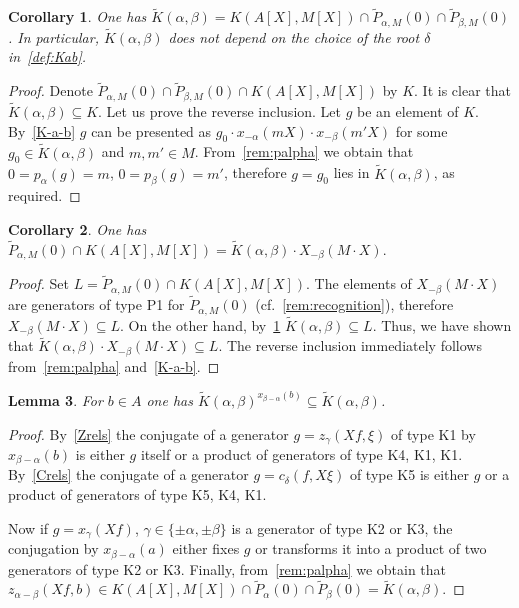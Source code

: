 \documentclass[oneside, 8pt]{amsart}
\newtheorem{lemma}{Lemma}
\newtheorem{corollary}[lemma]{Corollary}
\theoremstyle{remark}
\theoremstyle{definition}
\numberwithin{lemma}{section}
\numberwithin{prop}{section}
\numberwithin{corollary}{section}
\numberwithin{externaltheorem}{section}
\numberwithin{equation}{section}
\begin{document}
\begin{corollary} \label{K-a-b-cor}
One has $\widetilde{K}(\alpha, \beta) = K(A[X], M[X]) \cap \widetilde{P}_{\alpha, M}(0) \cap \widetilde{P}_{\beta, M}(0)$. In particular, $\widetilde{K}(\alpha, \beta)$ does not depend on the choice of the root $\delta$ in~\cref{def:Kab}.
\end{corollary}
\begin{proof} Denote $\widetilde{P}_{\alpha, M}(0) \cap \widetilde{P}_{\beta, M}(0) \cap K(A[X], M[X])$ by $K$. It is clear that $\widetilde{K}(\alpha, \beta) \subseteq K$. 
Let us prove the reverse inclusion. Let $g$ be an element of $K$.
By~\cref{K-a-b} $g$ can be presented as $g_0 \cdot x_{-\alpha}(mX) \cdot x_{-\beta}(m'X)$ for some $g_0 \in \widetilde{K}(\alpha, \beta)$ and $m, m' \in M$. From~\cref{rem:palpha} we obtain that $0 = p_\alpha(g) = m$, $0 = p_\beta(g) = m'$, therefore $g = g_0$ lies in $\widetilde{K}(\alpha, \beta)$, as required.\end{proof}

\begin{corollary} \label{K-a-b-cor2}
 One has $\widetilde{P}_{\alpha, M}(0) \cap K(A[X], M[X]) = \widetilde{K}(\alpha, \beta) \cdot X_{-\beta}(M \cdot X).$ 
\end{corollary}
\begin{proof} Set $L = \widetilde{P}_{\alpha, M}(0) \cap K(A[X], M[X])$.
The elements of $X_{-\beta}(M\cdot X)$ are generators of type P1 for $\widetilde{P}_{\alpha, M}(0)$ (cf.~\cref{rem:recognition}),
 therefore $X_{-\beta}(M \cdot X) \subseteq L$. On the other hand, by~\cref{K-a-b-cor} $\widetilde{K}(\alpha, \beta) \subseteq L$. Thus, we have shown that $\widetilde{K}(\alpha, \beta) \cdot X_{-\beta}(M \cdot X) \subseteq L$. The reverse inclusion immediately follows from~\cref{rem:palpha} and~\cref{K-a-b}.
 \end{proof}
 
\begin{lemma} \label{conj-K-a-b} For $b \in A$ one has $\widetilde{K}(\alpha, \beta)^{x_{\beta - \alpha}(b)} \subseteq \widetilde{K}(\alpha, \beta)$. \end{lemma}
\begin{proof} By~\cref{Zrels} the conjugate of a generator $g = z_\gamma(Xf, \xi)$ of type K1 by $x_{\beta-\alpha}(b)$ is either $g$ itself or a product of generators of type K4, K1, K1. By~\cref{Crels} the conjugate of a generator $g = c_\delta(f, X\xi)$ of type K5 is either $g$ or a product of generators of type K5, K4, K1.

Now if $g = x_\gamma(Xf)$, $\gamma \in \{\pm \alpha, \pm \beta\}$ is a generator of type K2 or K3, the conjugation by $x_{\beta-\alpha}(a)$ either fixes $g$ or transforms it into a product of two generators of type K2 or K3.  Finally, from~\cref{rem:palpha} we obtain that $z_{\alpha-\beta}(Xf, b) \in K(A[X], M[X]) \cap \widetilde{P}_\alpha(0) \cap \widetilde{P}_{\beta}(0) = \widetilde{K}(\alpha, \beta)$. \end{proof}  
\end{document}
